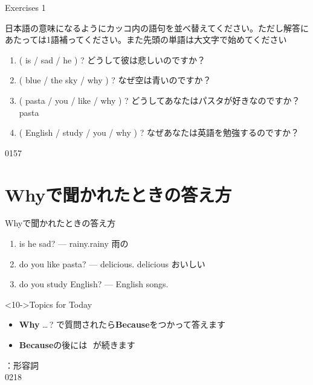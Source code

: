 \documentclass[aspectratio=169,xcolor={dvipsnames,table}]{beamer}
\begin{document}
\begin{frame}[plain]{Exercises 1}

{\small 日本語の意味になるようにカッコ内の語句を並べ替えてください。ただし解答にあたっては1語補ってください。また先頭の単語は大文字で始めてください}
 \begin{enumerate}
  \item ( is / sad / he ) ? どうして彼は悲しいのですか？\\
  \item ( blue / the sky / why ) ? なぜ空は青いのですか？\\
  \item ( pasta / you / like / why ) ? どうしてあなたはパスタが好きなのですか？\\
\hfill{\scriptsize pasta }
  \item ( English / study / you / why ) ? なぜあなたは英語を勉強するのですか？\\
 \end{enumerate}

\hfill{\tiny 0157}\,{\scriptsize {}}
\end{frame}
\section{Whyで聞かれたときの答え方}
\begin{frame}[plain]{Whyで聞かれたときの答え方}
 \begin{enumerate}
  \item<1->  is he sad? ---   rainy.\hfill{\scriptsize rainy   雨の}
  \item<4->  do you like pasta? ---   delicious.%
\hfill{\scriptsize delicious   おいしい}
  \item<7->  do you study English? ---   English songs.
 \end{enumerate}

\bigskip

\begin{block}<10->{Topics for Today}
\begin{itemize}[square]\small
 \item {\bfseries Why} \ldots\,?\,\,で質問されたら{\bfseries Because}をつかって答えます\hfill{\small {}}
 \item {\bfseries Because}の後には\,\,\,\,が続きます
\end{itemize}
     \end{block}

\hfill{\scriptsize {}：形容詞}\\
\hfill{\tiny 0218}\,{\scriptsize {}}
\end{frame}
\end{document}
